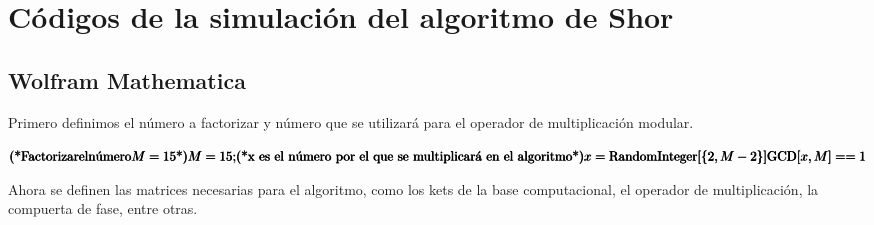 \chapter{Códigos de la simulación del algoritmo de Shor}

\section{Wolfram Mathematica}

Primero definimos el número a factorizar y número que se utilizará para el operador de multiplicación modular.

\begin{doublespace}
\noindent\(\pmb{\text{(*}\text{Factorizar} \text{el} \text{n{\' u}mero} M=15\text{*)}}\\
\pmb{M=15;}\\
\pmb{\text{(*x es el n{\' u}mero por el que se multiplicar{\' a} en el algoritmo*)}}\\
\pmb{x=\text{RandomInteger}[\{2,M-2\}]}\\
\pmb{\text{GCD}[x,M]==1}\)
\end{doublespace}

Ahora se definen las matrices necesarias para el algoritmo, como los kets de la base computacional, el operador de multiplicación, la compuerta de fase, entre otras.

